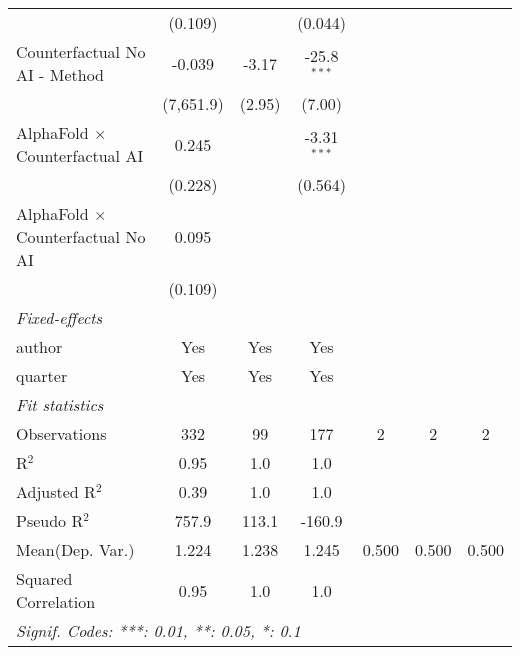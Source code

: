 \begin{tabular}{lcccccc}
                                            & (0.109)      &                & (0.044)        &     &     &   \\   
   Counterfactual No AI - Method            & -0.039       & -3.17          & -25.8$^{***}$  &     &     &   \\   
                                            & (7,651.9)    & (2.95)         & (7.00)         &     &     &   \\   
   AlphaFold $\times$ Counterfactual AI     & 0.245        &                & -3.31$^{***}$  &     &     &   \\   
                                            & (0.228)      &                & (0.564)        &     &     &   \\   
   AlphaFold $\times$ Counterfactual No AI  & 0.095        &                &                &     &     &   \\   
                                            & (0.109)      &                &                &     &     &   \\   
   \midrule
   \emph{Fixed-effects}\\
   author                                   & Yes          & Yes            & Yes            &     &     & \\  
   quarter                                  & Yes          & Yes            & Yes            &     &     & \\  
   \midrule
   \emph{Fit statistics}\\
   Observations                             & 332          & 99             & 177            & 2   & 2   & 2\\  
   R$^2$                                    & 0.95         & 1.0            & 1.0            &     &     & \\  
   Adjusted R$^2$                           & 0.39         & 1.0            & 1.0            &     &     & \\  
   Pseudo R$^2$                             & 757.9        & 113.1          & -160.9         &     &     & \\  
Mean(Dep. Var.) & 1.224 & 1.238 & 1.245 & 0.500 & 0.500 & 0.500 \\
   Squared Correlation                      & 0.95         & 1.0            & 1.0            &     &     & \\  
   \midrule \midrule
   \multicolumn{7}{l}{\emph{Signif. Codes: ***: 0.01, **: 0.05, *: 0.1}}\\
\end{tabular}
\par\endgroup
